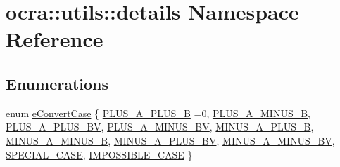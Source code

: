 \hypertarget{namespaceocra_1_1utils_1_1details}{}\section{ocra\+:\+:utils\+:\+:details Namespace Reference}
\label{namespaceocra_1_1utils_1_1details}
\subsection*{Enumerations}
\begin{DoxyCompactItemize}
\item 
enum \hyperlink{namespaceocra_1_1utils_1_1details_a617d399055aa54cfdf2d3199ca91c399}{e\+Convert\+Case} \{ \newline
\hyperlink{namespaceocra_1_1utils_1_1details_a617d399055aa54cfdf2d3199ca91c399a03eb35928d61fd2a957cf41c6c4578ca}{P\+L\+U\+S\+\_\+\+A\+\_\+\+P\+L\+U\+S\+\_\+B} =0, 
\hyperlink{namespaceocra_1_1utils_1_1details_a617d399055aa54cfdf2d3199ca91c399a4d0375804693ed7a4e1ff4e40b1d067b}{P\+L\+U\+S\+\_\+\+A\+\_\+\+M\+I\+N\+U\+S\+\_\+B}, 
\hyperlink{namespaceocra_1_1utils_1_1details_a617d399055aa54cfdf2d3199ca91c399a5c4183c0fd47b8c64276843dda690de7}{P\+L\+U\+S\+\_\+\+A\+\_\+\+P\+L\+U\+S\+\_\+\+BV}, 
\hyperlink{namespaceocra_1_1utils_1_1details_a617d399055aa54cfdf2d3199ca91c399a78c37c659e4056c97d766ab9621e01ff}{P\+L\+U\+S\+\_\+\+A\+\_\+\+M\+I\+N\+U\+S\+\_\+\+BV}, 
\newline
\hyperlink{namespaceocra_1_1utils_1_1details_a617d399055aa54cfdf2d3199ca91c399aa51f84eadd7c02e17fcae444cd646c79}{M\+I\+N\+U\+S\+\_\+\+A\+\_\+\+P\+L\+U\+S\+\_\+B}, 
\hyperlink{namespaceocra_1_1utils_1_1details_a617d399055aa54cfdf2d3199ca91c399afb7decc69a9b25a7b762f2084e9d52f0}{M\+I\+N\+U\+S\+\_\+\+A\+\_\+\+M\+I\+N\+U\+S\+\_\+B}, 
\hyperlink{namespaceocra_1_1utils_1_1details_a617d399055aa54cfdf2d3199ca91c399a6de905f897737b898a7c188c7d9c85b8}{M\+I\+N\+U\+S\+\_\+\+A\+\_\+\+P\+L\+U\+S\+\_\+\+BV}, 
\hyperlink{namespaceocra_1_1utils_1_1details_a617d399055aa54cfdf2d3199ca91c399a10d452d5d1cdb90b7216e1e49ad73b8e}{M\+I\+N\+U\+S\+\_\+\+A\+\_\+\+M\+I\+N\+U\+S\+\_\+\+BV}, 
\newline
\hyperlink{namespaceocra_1_1utils_1_1details_a617d399055aa54cfdf2d3199ca91c399ac32fdefb96f856fd13bfad381529309e}{S\+P\+E\+C\+I\+A\+L\+\_\+\+C\+A\+SE}, 
\hyperlink{namespaceocra_1_1utils_1_1details_a617d399055aa54cfdf2d3199ca91c399acaa13d6c21f24f969be8e5e53329d178}{I\+M\+P\+O\+S\+S\+I\+B\+L\+E\+\_\+\+C\+A\+SE}
 \}
\end{DoxyCompactItemize}

